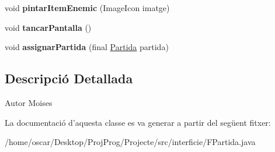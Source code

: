 \begin{DoxyCompactItemize}
\item 
\hypertarget{classinterficie_1_1_f_partida_a5b079601d2de0f3a1234d4e61fc8460c}{void {\bfseries pintar\+Item\+Enemic} (Image\+Icon imatge)}\label{classinterficie_1_1_f_partida_a5b079601d2de0f3a1234d4e61fc8460c}

\item 
\hypertarget{classinterficie_1_1_f_partida_a20901e8125ab0eb9202f51f8f7859a3b}{void {\bfseries tancar\+Pantalla} ()}\label{classinterficie_1_1_f_partida_a20901e8125ab0eb9202f51f8f7859a3b}

\item 
\hypertarget{classinterficie_1_1_f_partida_a4171c2e25f5868e1422cccf7f8018dbc}{void {\bfseries assignar\+Partida} (final \hyperlink{classlogica_1_1_partida}{Partida} partida)}\label{classinterficie_1_1_f_partida_a4171c2e25f5868e1422cccf7f8018dbc}

\end{DoxyCompactItemize}


\subsection{Descripció Detallada}
\begin{DoxyAuthor}{Autor}
Moises 
\end{DoxyAuthor}


La documentació d'aquesta classe es va generar a partir del següent fitxer\+:\begin{DoxyCompactItemize}
\item 
/home/oscar/\+Desktop/\+Proj\+Prog/\+Projecte/src/interficie/F\+Partida.\+java\end{DoxyCompactItemize}
